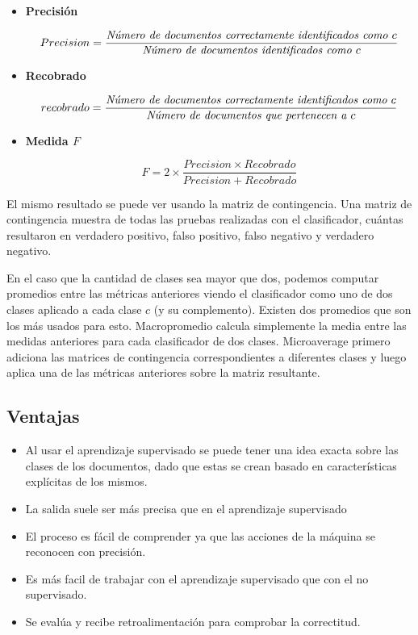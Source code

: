\documentclass{llncs}
\begin{document}
			\begin{itemize}
				
				\item\textbf{Precisi\'on}
				
				\[
				Precision = \frac{\emph{N\'umero de documentos correctamente identificados como $c$} }{\emph{N\'umero de documentos identificados como $c$}}
				\]
				
				\item\textbf{Recobrado}
				
				\[
				recobrado = \frac{\emph{N\'umero de documentos correctamente identificados como $c$} }{\emph{N\'umero de documentos que pertenecen a $c$}}
				\]
				
				\item\textbf{Medida $F$} 
				
				\[
					F = 2 \times  \frac{Precision \times Recobrado}{Precision + Recobrado}
				\]
				
				
			\end{itemize}
			
			El mismo resultado se puede ver usando la matriz de contingencia. Una matriz de contingencia muestra de todas las pruebas realizadas con el clasificador, cu\'antas resultaron en verdadero positivo, falso positivo, falso negativo y verdadero negativo.
			
			En el caso que la cantidad de clases sea mayor que dos, podemos computar promedios entre las m\'etricas anteriores viendo el clasificador como uno de dos clases aplicado a cada clase $c$ (y su complemento). Existen dos promedios que son los m\'as usados para esto. Macropromedio calcula simplemente la media entre las medidas anteriores para cada clasificador de dos clases. Microaverage primero adiciona las matrices de contingencia correspondientes a diferentes clases y luego aplica una de las m\'etricas anteriores sobre la matriz resultante. 
			
			
		\subsection{Ventajas}
				\begin{itemize}
					\item Al usar el aprendizaje supervisado se puede tener una idea exacta sobre las clases de los documentos, dado que estas se crean basado en caracter\'isticas expl\'icitas de los mismos. 
					\item La salida suele ser m\'as precisa que en el aprendizaje supervisado
					\item El proceso es f\'acil de comprender ya que las acciones de la m\'aquina se reconocen con precisi\'on.
					\item Es m\'as facil de trabajar con el aprendizaje supervisado que con el no supervisado. 
					\item Se eval\'ua y recibe retroalimentaci\'on para comprobar la correctitud. 
				\end{itemize}
		
\end{document}
